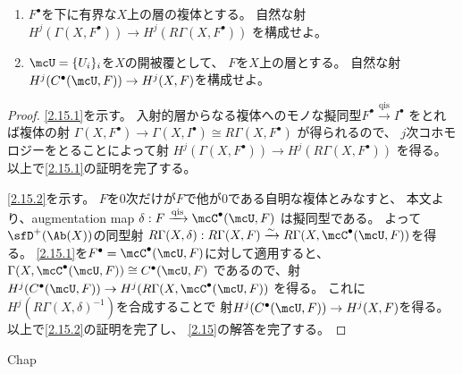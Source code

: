 \documentclass[uplatex,dvipdfmx]{jsarticle}
\begin{document}
\maketitle
\HeaderCommentA
\section{}

\fi



\begin{prob}\label{2.15}
  \begin{enumerate}
    \item \label{2.15.1}
    \(F^{\bullet}\)を下に有界な\(X\)上の層の複体とする。
    自然な射
    \(H^j(\Gamma(X,F^{\bullet})) \to H^j(R\Gamma(X,F^{\bullet}))\)
    を構成せよ。
    \item \label{2.15.2}
    \(\mcU = \{U_i\}_i\)を\(X\)の開被覆として、
    \(F\)を\(X\)上の層とする。
    自然な射\(H^j(C^{\bullet}(\mcU,F)) \to H^j(X,F)\)を構成せよ。
  \end{enumerate}
\end{prob}

\begin{proof}
  \ref{2.15.1}を示す。
  入射的層からなる複体へのモノな擬同型\(F^{\bullet}\xrightarrow{\text{qis}}I^{\bullet}\)
  をとれば複体の射
  \(\Gamma(X,F^{\bullet})\to \Gamma(X,I^{\bullet})\cong R\Gamma(X,F^{\bullet})\)
  が得られるので、
  \(j\)次コホモロジーをとることによって射
  \(H^j(\Gamma(X,F^{\bullet})) \to H^j(R\Gamma(X,F^{\bullet}))\)
  を得る。
  以上で\ref{2.15.1}の証明を完了する。

  \ref{2.15.2}を示す。
  \(F\)を\(0\)次だけが\(F\)で他が\(0\)である自明な複体とみなすと、
  本文\cite[Proposition 2.8.4]{kashiwara2002sheaves}より、augmentation map
  \(\delta:F\xrightarrow{\text{qis}} \mcC^{\bullet}(\mcU,F)\)
  は擬同型である。
  よって\(\sfD^+(\Ab(X))\)の同型射
  \(R\Gamma(X,\delta):R\Gamma(X,F)\xrightarrow{\sim}
  R\Gamma(X,\mcC^{\bullet}(\mcU,F))\)を得る。
  \ref{2.15.1}を\(F^{\bullet} = \mcC^{\bullet}(\mcU,F)\)に対して適用すると、
  \(\Gamma(X,\mcC^{\bullet}(\mcU,F)) \cong C^{\bullet}(\mcU,F)\)
  であるので、射
  \(H^j(C^{\bullet}(\mcU,F)) \to H^j(R\Gamma(X,\mcC^{\bullet}(\mcU,F))\)
  を得る。
  これに\(H^j(R\Gamma(X,\delta)^{-1})\)を合成することで
  射\(H^j(C^{\bullet}(\mcU,F))\to H^j(X,F)\)を得る。
  以上で\ref{2.15.2}の証明を完了し、
  \autoref{2.15}の解答を完了する。
\end{proof}




\ifcsname Chap\endcsname\else
\printbibliography
\end{document}
